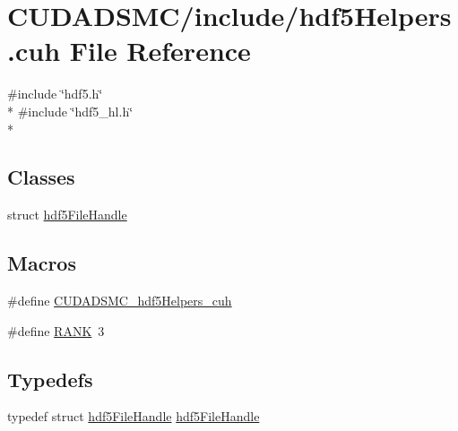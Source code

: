 \hypertarget{hdf5_helpers_8cuh}{\section{C\+U\+D\+A\+D\+S\+M\+C/include/hdf5\+Helpers.cuh File Reference}
\label{hdf5_helpers_8cuh}
}
{\ttfamily \#include \char`\"{}hdf5.\+h\char`\"{}}\\*
{\ttfamily \#include \char`\"{}hdf5\+\_\+hl.\+h\char`\"{}}\\*
\subsection*{Classes}
\begin{DoxyCompactItemize}
\item 
struct \hyperlink{structhdf5_file_handle}{hdf5\+File\+Handle}
\end{DoxyCompactItemize}
\subsection*{Macros}
\begin{DoxyCompactItemize}
\item 
\#define \hyperlink{hdf5_helpers_8cuh_aebe4dc6d7f7166f335c0bfb7c8eb81bd}{C\+U\+D\+A\+D\+S\+M\+C\+\_\+hdf5\+Helpers\+\_\+cuh}
\item 
\#define \hyperlink{hdf5_helpers_8cuh_a4e76a9ce86d91fa75775a7ae3f8d3aa5}{R\+A\+N\+K}~3
\end{DoxyCompactItemize}
\subsection*{Typedefs}
\begin{DoxyCompactItemize}
\item 
typedef struct \hyperlink{structhdf5_file_handle}{hdf5\+File\+Handle} \hyperlink{hdf5_helpers_8cuh_a0d19c94d0c74817d6f267b58c3e2ef61}{hdf5\+File\+Handle}
\end{DoxyCompactItemize}
